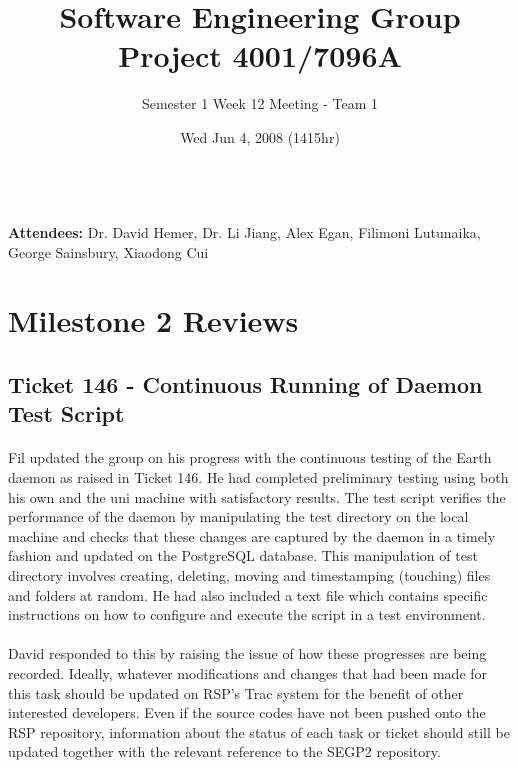 \documentclass[10pt, a4]{article}
\begin{document}
\title{Software Engineering Group Project 4001/7096A}
\author{Semester 1 Week 12 Meeting - Team 1}
\date{Wed Jun 4, 2008 (1415hr)}

\maketitle
 
\\
 
\noindent \textbf{Attendees:} Dr. David Hemer, Dr. Li Jiang, Alex Egan, 
Filimoni Lutunaika, George Sainsbury, Xiaodong Cui\\

\section{Milestone 2 Reviews}

\subsection{Ticket 146 - Continuous Running of Daemon Test Script}

\paragraph{}Fil updated the group on his progress with the continuous 
testing of the Earth daemon as raised in Ticket 146. He had completed
preliminary testing using both his own and the uni machine with satisfactory 
results. The test script verifies the performance of the daemon by 
manipulating the test directory on the local machine and checks that 
these changes are captured by the daemon in a timely fashion and updated 
on the PostgreSQL database. This manipulation of test directory involves 
creating, deleting, moving and timestamping (touching) files and folders at 
random. He had also included a text file which contains specific 
instructions on how to configure and execute the script in a test environment.

\paragraph{} David responded to this by raising the issue of how these 
progresses are being recorded. Ideally, whatever modifications and changes 
that had been made for this task should be updated on RSP's Trac system
for the benefit of other interested developers. Even if the source codes 
have not been pushed onto the RSP repository, information about the status
of each task or ticket should still be updated together with the relevant 
reference to the SEGP2 repository.
\end{document}
